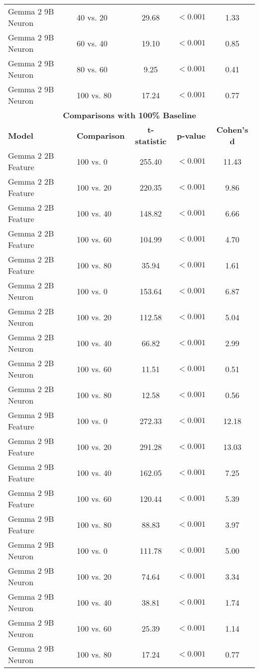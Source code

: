 \begin{table*}[h]
\begin{tabular}{llccc}
Gemma 2 9B Neuron & 40 vs. 20 & 29.68 & $<0.001$ & 1.33 \\
Gemma 2 9B Neuron & 60 vs. 40 & 19.10 & $<0.001$ & 0.85 \\
Gemma 2 9B Neuron & 80 vs. 60 & 9.25 & $<0.001$ & 0.41 \\
Gemma 2 9B Neuron & 100 vs. 80 & 17.24 & $<0.001$ & 0.77 \\
\midrule
\bottomrule
\multicolumn{5}{c}{\textbf{Comparisons with 100\% Baseline}} \\
\toprule
\textbf{Model} & \textbf{Comparison} & \textbf{t-statistic} & \textbf{p-value} & \textbf{Cohen's d} \\
\midrule
Gemma 2 2B Feature & 100 vs. 0 & 255.40 & $<0.001$ & 11.43 \\
Gemma 2 2B Feature & 100 vs. 20 & 220.35 & $<0.001$ & 9.86 \\
Gemma 2 2B Feature & 100 vs. 40 & 148.82 & $<0.001$ & 6.66 \\
Gemma 2 2B Feature & 100 vs. 60 & 104.99 & $<0.001$ & 4.70 \\
Gemma 2 2B Feature & 100 vs. 80 & 35.94 & $<0.001$ & 1.61 \\
\midrule
Gemma 2 2B Neuron & 100 vs. 0 & 153.64 & $<0.001$ & 6.87 \\
Gemma 2 2B Neuron & 100 vs. 20 & 112.58 & $<0.001$ & 5.04 \\
Gemma 2 2B Neuron & 100 vs. 40 & 66.82 & $<0.001$ & 2.99 \\
Gemma 2 2B Neuron & 100 vs. 60 & 11.51 & $<0.001$ & 0.51 \\
Gemma 2 2B Neuron & 100 vs. 80 & 12.58 & $<0.001$ & 0.56 \\
\midrule
Gemma 2 9B Feature & 100 vs. 0 & 272.33 & $<0.001$ & 12.18 \\
Gemma 2 9B Feature & 100 vs. 20 & 291.28 & $<0.001$ & 13.03 \\
Gemma 2 9B Feature & 100 vs. 40 & 162.05 & $<0.001$ & 7.25 \\
Gemma 2 9B Feature & 100 vs. 60 & 120.44 & $<0.001$ & 5.39 \\
Gemma 2 9B Feature & 100 vs. 80 & 88.83 & $<0.001$ & 3.97 \\
\midrule
Gemma 2 9B Neuron & 100 vs. 0 & 111.78 & $<0.001$ & 5.00 \\
Gemma 2 9B Neuron & 100 vs. 20 & 74.64 & $<0.001$ & 3.34 \\
Gemma 2 9B Neuron & 100 vs. 40 & 38.81 & $<0.001$ & 1.74 \\
Gemma 2 9B Neuron & 100 vs. 60 & 25.39 & $<0.001$ & 1.14 \\
Gemma 2 9B Neuron & 100 vs. 80 & 17.24 & $<0.001$ & 0.77 \\
\midrule
\bottomrule
\end{tabular}
\caption{Statistical analysis of activation distribution separation. We report t-statistics, p-values, and Cohen's d effect sizes for both adjacent ratio comparisons and comparisons with the 100\% condition. Adjacent ratio comparisons show the separation between consecutive ratios, while baseline comparisons demonstrate the differences from the full relation-facts condition.}
\label{appendix: table:monosemanticity_statistics}
\end{table*}
